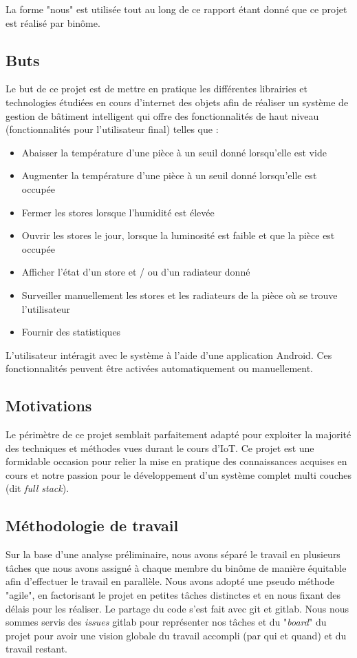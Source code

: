 La forme "nous" est utilisée tout au long de ce rapport étant donné que ce projet est réalisé par binôme.

\subsection{Buts}
Le but de ce projet est de mettre en pratique les différentes librairies et technologies étudiées en cours d'internet des objets afin de réaliser un système de gestion de bâtiment intelligent qui offre des fonctionnalités de haut niveau (fonctionnalités pour l'utilisateur final) telles que :
\begin{itemize}
    \item Abaisser la température d'une pièce à un seuil donné lorsqu'elle est vide
    \item Augmenter la température d'une pièce à un seuil donné lorsqu'elle est occupée
    \item Fermer les stores lorsque l'humidité est élevée
    \item Ouvrir les stores le jour, lorsque la luminosité est faible et que la pièce est occupée
    \item Afficher l'état d'un store et / ou d'un radiateur donné
    \item Surveiller manuellement les stores et les radiateurs de la pièce où se trouve l'utilisateur
    \item Fournir des statistiques
\end{itemize}
L'utilisateur intéragit avec le système à l'aide d'une application Android. Ces fonctionnalités peuvent être activées automatiquement ou manuellement.

\subsection{Motivations}
Le périmètre de ce projet semblait parfaitement adapté pour exploiter la majorité des techniques et méthodes vues durant le cours d'IoT. Ce projet est une formidable occasion pour relier la mise en pratique des connaissances acquises en cours et notre passion pour le développement d'un système complet multi couches (dit \textit{full stack}).

\subsection{Méthodologie de travail}
Sur la base d'une analyse préliminaire, nous avons séparé le travail en plusieurs tâches que nous avons assigné à chaque membre du binôme de manière équitable afin d'effectuer le travail en parallèle.
Nous avons adopté une pseudo méthode "agile", en factorisant le projet en petites tâches distinctes et en nous fixant des délais pour les réaliser. Le partage du code s'est fait avec git et gitlab. Nous nous sommes servis des \textit{issues} gitlab pour représenter nos tâches et du "\textit{board}" du projet pour avoir une vision globale du travail accompli (par qui et quand) et du travail restant.
